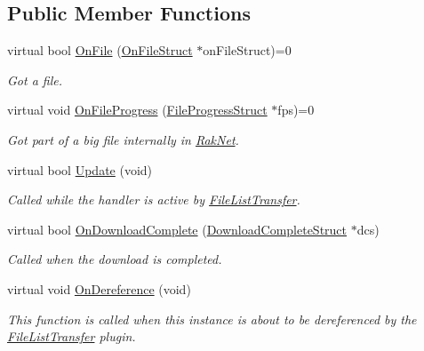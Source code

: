 \subsection*{Public Member Functions}
\begin{DoxyCompactItemize}
\item 
virtual bool \hyperlink{class_rak_net_1_1_file_list_transfer_c_b_interface_ad76acca10f79fc228ab6281a92b0c4a3}{On\-File} (\hyperlink{struct_rak_net_1_1_file_list_transfer_c_b_interface_1_1_on_file_struct}{On\-File\-Struct} $\ast$on\-File\-Struct)=0
\begin{DoxyCompactList}\small\item\em Got a file. \end{DoxyCompactList}\item 
virtual void \hyperlink{class_rak_net_1_1_file_list_transfer_c_b_interface_a2a66bf79748c3d0d84d28704dd65a366}{On\-File\-Progress} (\hyperlink{struct_rak_net_1_1_file_list_transfer_c_b_interface_1_1_file_progress_struct}{File\-Progress\-Struct} $\ast$fps)=0
\begin{DoxyCompactList}\small\item\em Got part of a big file internally in \hyperlink{namespace_rak_net}{Rak\-Net}. \end{DoxyCompactList}\item 
virtual bool \hyperlink{class_rak_net_1_1_file_list_transfer_c_b_interface_a9a7baa02f61c5ef154f40ac6b6d77f84}{Update} (void)
\begin{DoxyCompactList}\small\item\em Called while the handler is active by \hyperlink{class_rak_net_1_1_file_list_transfer}{File\-List\-Transfer}. \end{DoxyCompactList}\item 
virtual bool \hyperlink{class_rak_net_1_1_file_list_transfer_c_b_interface_a67a7f0fef54fbaf01651857f7f808805}{On\-Download\-Complete} (\hyperlink{struct_rak_net_1_1_file_list_transfer_c_b_interface_1_1_download_complete_struct}{Download\-Complete\-Struct} $\ast$dcs)
\begin{DoxyCompactList}\small\item\em Called when the download is completed. \end{DoxyCompactList}\item 
virtual void \hyperlink{class_rak_net_1_1_file_list_transfer_c_b_interface_a968411780da34ca06fc473f1cb4b1e84}{On\-Dereference} (void)
\begin{DoxyCompactList}\small\item\em This function is called when this instance is about to be dereferenced by the \hyperlink{class_rak_net_1_1_file_list_transfer}{File\-List\-Transfer} plugin. \end{DoxyCompactList}\end{DoxyCompactItemize}


